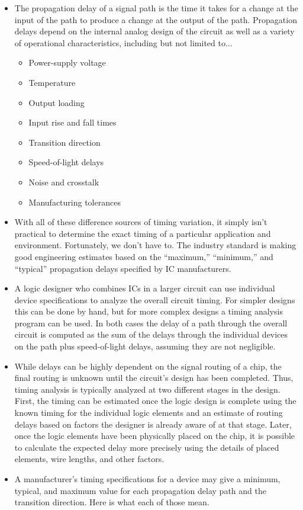 \documentclass[10pt,a4paper]{article}
\begin{document}
\begin{itemize}
\item The propagation delay of a signal path is the time it takes for a change at the input of the path to produce a change at the output of the path. Propagation delays depend on the internal analog design of the circuit as well as a variety of operational characteristics, including but not limited to...
\begin{itemize}
\item Power-supply voltage
\item Temperature
\item Output loading
\item Input rise and fall times
\item Transition direction
\item Speed-of-light delays
\item Noise and crosstalk
\item Manufacturing tolerances
\end{itemize}
\item With all of these difference sources of timing variation, it simply isn't practical to determine the exact timing of a particular application and environment. Fortunately, we don't have to. The industry standard is making good engineering estimates based on the ``maximum,'' ``minimum,'' and ``typical'' propagation delays specified by IC manufacturers. 
\item A logic designer who combines ICs in a larger circuit can use individual device specifications to analyze the overall circuit timing. For simpler designs this can be done by hand, but for more complex designs a timing analysis program can be used. In both cases the delay of a path through the overall circuit is computed as the sum of the delays through the individual devices on the path plus speed-of-light delays, assuming they are not negligible.
\item While delays can be highly dependent on the signal routing of a chip, the final routing is unknown until the circuit's design has been completed. Thus, timing analysis is typically analyzed at two different stages in the design. First, the timing can be estimated once the logic design is complete using the known timing for the individual logic elements and an estimate of routing delays based on factors the designer is already aware of at that stage. Later, once the logic elements have been physically placed on the chip, it is possible to calculate the expected delay more precisely using the details of placed elements, wire lengths, and other factors. 
\item A manufacturer's timing specifications for a device may give a minimum, typical, and maximum value for each propagation delay path and the transition direction. Here is what each of those mean.

\end{itemize}
\end{document}
